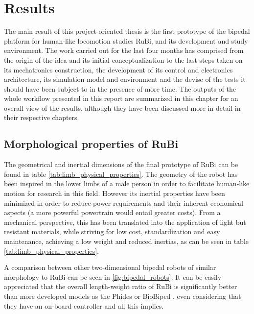 \chapter{Results} %
\label{cha:results}
The main result of this project-oriented thesis is the first prototype of the bipedal platform for human-like locomotion studies RuBi, and its development and study environment.
The work carried out for the last four months has comprised from the origin of the idea and its initial conceptualization to the last steps taken on its mechatronics construction, the development of its control and electronics architecture, its simulation model and environment and the devise of the tests it should have been subject to in the presence of more time.
The outputs of the whole workflow presented in this report are summarized in this chapter for an overall view of the results, although they have been discussed more in detail in their respective chapters.


\section{Morphological properties of RuBi} %
\label{sec:rubi_mechanical_properties}
The geometrical and inertial dimensions of the final prototype of RuBi can be found in table \ref{tab:limb_physical_properties}.
The geometry of the robot has been inspired in the lower limbs of a male person in order to facilitate human-like motion for research in this field.
However its inertial properties have been minimized in order to reduce power requirements and their inherent economical aspects (a more powerful powertrain would entail greater costs).
From a mechanical perspective, this has been translated into the application of light but resistant materials, while striving for low cost, standardization and easy maintenance, achieving a low weight and reduced inertias, as can be seen in table \ref{tab:limb_physical_properties}.

A comparison between other two-dimensional bipedal robots of similar morphology to RuBi can be seen in \ref{fig:bipedal_robots}.
It can be easily appreciated that the overall length-weight ratio of RuBi is significantly better than more developed models as the Phides \cite{phides} or BioBiped \cite{biobiped}, even considering that they have an on-board controller and all this implies.

